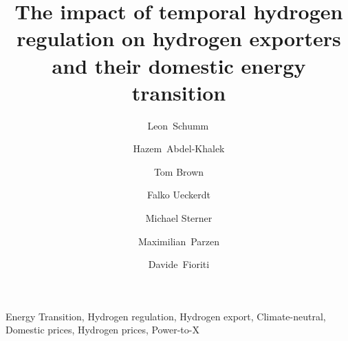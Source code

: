 \documentclass[5p,numafflabel]{elsarticle}
\begin{document}
\begin{frontmatter}

	\title{The impact of temporal hydrogen regulation on hydrogen exporters and their domestic energy transition}
    
	\author[oth,tub,lead]{Leon~Schumm\,}
	\author[ieg,alu]{Hazem~Abdel-Khalek}
	\author[tub]{Tom Brown}
	\author[pik]{Falko Ueckerdt}
	\author[oth]{Michael Sterner}
	\author[uoe]{Maximilian~Parzen}
	\author[unipi]{Davide~Fioriti}


	\address[oth]{Research Center on Energy Transmission and Storage (FENES), Faculty of Electrical and Information Technology, University of Applied Sciences (OTH) Regensburg, Seybothstr. 2, 93053 Regensburg, Germany}
	\address[tub]{Department of Digital Transformation in Energy Systems, Institute of Energy Technology, Technische Universität Berlin, Fakultät III, Einsteinufer 25 (TA 8), 10587 Berlin, Germany}
	\address[ieg]{Fraunhofer Research Institution for Energy Infrastructures and Geothermal Systems IEG, Gulbener Straße 23, 03046 Cottbus, Germany}
	\address[alu]{Albert-Ludwigs Universität Freiburg, Faculty of Environment and Natural Resources, Tennenbacher Str. 4, 79106 Freiburg im Breisgau, Germany}
	\address[pik]{Potsdam Institute for Climate Impact Research, Telegrafenberg, 14473 Potsdam, Germany}
	\address[uoe]{University of Edinburgh, Institute for Energy Systems, EH9 3DW Edinburgh, United Kingdom}
	\address[unipi]{University of Pisa, Department of Energy Systems, Territory and Construction Engineering, Largo Lucio Lazzarino, 56122 Pisa, Italy}
	\address[lead]{Lead contact}

	\begin{abstract}
		
	\end{abstract}

	\begin{keyword}
		Energy Transition, Hydrogen regulation, Hydrogen export, Climate-neutral, Domestic prices, Hydrogen prices, Power-to-X
	\end{keyword}




\end{frontmatter}
\end{document}
